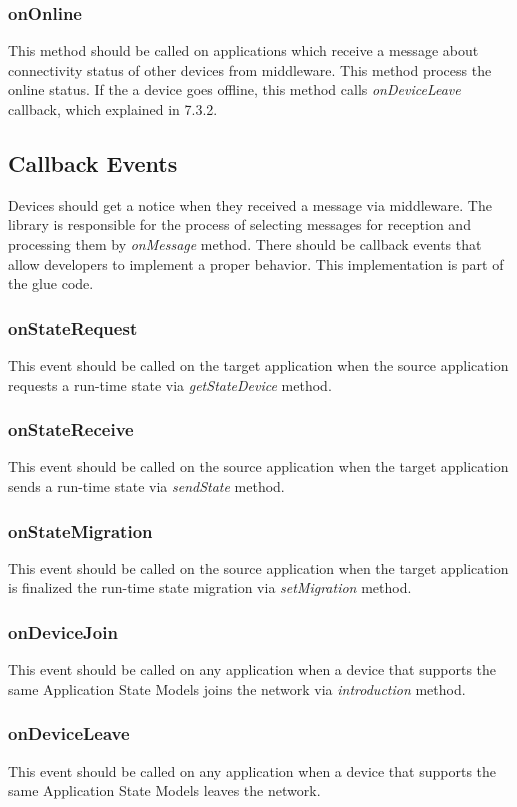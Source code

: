\subsubsection{onOnline}
This method should be called on applications which receive a message about connectivity status of other devices from middleware. This method process the online status. If the a device goes offline, this method calls \textit{onDeviceLeave} callback, which explained in 7.3.2.

\subsection{Callback Events}
Devices should get a notice when they received a message via middleware. The library is responsible for the process of selecting messages for reception and processing them by \textit{onMessage} method. There should be callback events that allow developers to implement a proper behavior. This implementation is part of the glue code.

\subsubsection{onStateRequest}
This event should be called on the target application when the source application requests a run-time state via \textit{getStateDevice} method.

\subsubsection{onStateReceive}
This event should be called on the source application when the target application sends a run-time state via \textit{sendState} method.

\subsubsection{onStateMigration}
This event should be called on the source application when the target application is finalized the run-time state migration via \textit{setMigration} method.

\subsubsection{onDeviceJoin}
This event should be called on any application when a device that supports the same Application State Models joins the network via \textit{introduction} method.

\subsubsection{onDeviceLeave}
This event should be called on any application when a device that supports the same Application State Models leaves the network.


